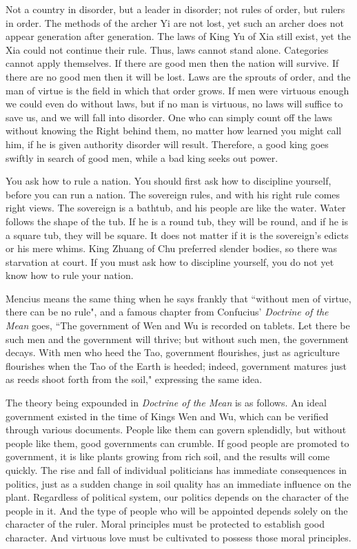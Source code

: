 \begin{quotationx}
Not a country in disorder, but a leader in disorder; not rules of order, but rulers in order. The methods of the archer Yi are not lost, yet such an archer does not appear generation after generation. The laws of King Yu of Xia still exist, yet the Xia could not continue their rule. Thus, laws cannot stand alone. Categories cannot apply themselves. If there are good men then the nation will survive. If there are no good men then it will be lost. Laws are the sprouts of order, and the man of virtue is the field in which that order grows. If men were virtuous enough we could even do without laws, but if no man is virtuous, no laws will suffice to save us, and we will fall into disorder. One who can simply count off the laws without knowing the Right behind them, no matter how learned you might call him, if he is given authority disorder will result. Therefore, a good king goes swiftly in search of good men, while a bad king seeks out power.

You ask how to rule a nation. You should first ask how to discipline yourself, before you can run a nation. The sovereign rules, and with his right rule comes right views. The sovereign is a bathtub, and his people are like the water. Water follows the shape of the tub. If he is a round tub, they will be round, and if he is a square tub, they will be square. It does not matter if it is the sovereign's edicts or his mere whims. King Zhuang of Chu preferred slender bodies, so there was starvation at court. If you must ask how to discipline yourself, you do not yet know how to rule your nation.
\end{quotationx}

Mencius means the same thing when he says frankly that ``without men of virtue, there can be no rule", and a famous chapter from Confucius' \emph{Doctrine of the Mean} goes, ``The government of Wen and Wu is recorded on tablets. Let there be such men and the government will thrive; but without such men, the government decays. With men who heed the Tao, government flourishes, just as agriculture flourishes when the Tao of the Earth is heeded; indeed, government matures just as reeds shoot forth from the soil," expressing the same idea.

The theory being expounded in \emph{Doctrine of the Mean} is as follows. An ideal government existed in the time of Kings Wen and Wu, which can be verified through various documents. People like them can govern splendidly, but without people like them, good governments can crumble. If good people are promoted to government, it is like plants growing from rich soil, and the results will come quickly. The rise and fall of individual politicians has immediate consequences in politics, just as a sudden change in soil quality has an immediate influence on the plant. Regardless of political system, our politics depends on the character of the people in it. And the type of people who will be appointed depends solely on the character of the ruler. Moral principles must be protected to establish good character. And virtuous love must be cultivated to possess those moral principles.


